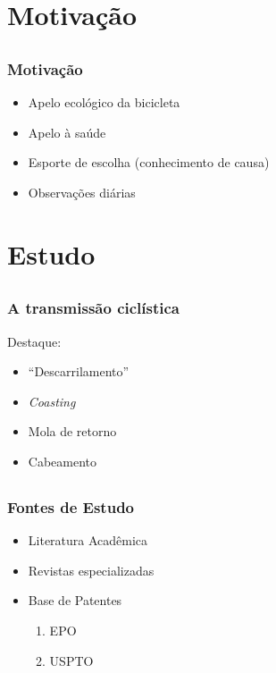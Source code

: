 \documentclass{beamer}
\begin{document}
\section{Motivação}

\subsection{}
\begin{frame}
 \frametitle{Motivação}

  \begin{itemize}[<+->]
    \item Apelo ecológico da bicicleta
    \item Apelo à saúde
    \item Esporte de escolha (conhecimento de causa)
    \item Observações diárias
  \end{itemize}

\end{frame}

\section{Estudo}
\subsection{}
\begin{frame}
  \frametitle{A transmissão ciclística}
  Destaque:
  \begin{itemize}
    \item ``Descarrilamento''
    \item \textit{Coasting}
    \item Mola de retorno
    \item Cabeamento
  \end{itemize}
\end{frame}

\subsection{}
\begin{frame}
  \frametitle{Fontes de Estudo}
  \begin{itemize}%
    \item Literatura Acadêmica
    \item Revistas especializadas
    \item Base de Patentes
      \begin{enumerate}
        \item EPO
        \item USPTO
      \end{enumerate}
  \end{itemize}
\end{frame}
\end{document}
